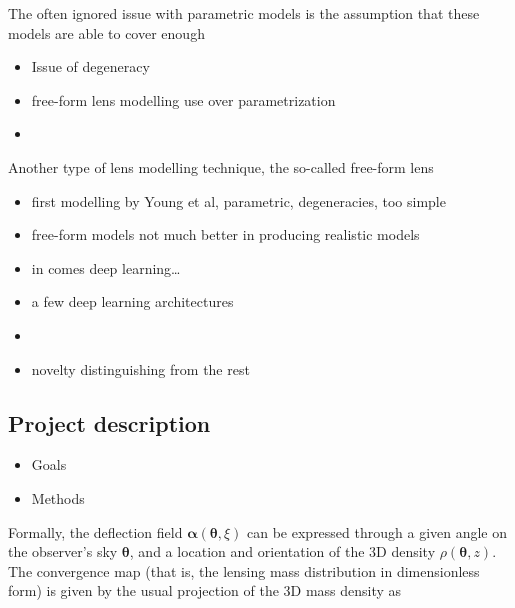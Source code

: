 \documentclass[a4paper,10pt]{article}
\begin{document}
The often ignored issue with parametric models is the assumption that
these models are able to cover enough 

\begin{itemize}
\item Issue of degeneracy

\item free-form lens modelling use over parametrization

\item 
\end{itemize}

Another type of lens modelling technique, the so-called
free-form lens 




\begin{itemize}
\item first modelling by Young et al, parametric, degeneracies, too simple
\item free-form models not much better in producing realistic models
\end{itemize}

\begin{itemize}
\item in comes deep learning\ldots{}
\item a few deep learning architectures
\item 
\end{itemize}


\begin{itemize}
\item novelty distinguishing from the rest
\end{itemize}

\subsection*{Project description}
\label{sec:orgb3dbdad}

\begin{itemize}
\item Goals

\item Methods
\end{itemize}

Formally, the deflection field \(\bm\alpha(\bm\theta, \xi)\) can be
expressed through a given angle on the observer's sky \(\bm\theta\), and
a location and orientation of the 3D density \(\rho(\bm\theta,z)\). The
convergence map (that is, the lensing mass distribution in
dimensionless form) is given by the usual projection of the 3D mass
density as
\end{document}

